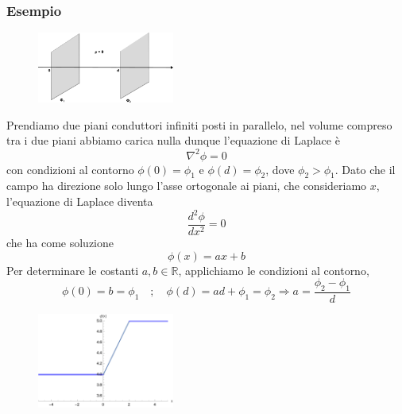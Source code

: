 \subsubsection{Esempio}
\begin{figure} %
    \centering
    \includegraphics[width=0.4\textwidth]{images/laplacezero} %
\end{figure}
Prendiamo due piani conduttori infiniti posti in parallelo, nel volume compreso tra i due piani abbiamo carica nulla dunque l'equazione di Laplace \`e 
\begin{equation*}
	\nabla^2 \phi = 0
\end{equation*}
con condizioni al contorno $\phi(0) = \phi_1$ e $\phi(d) = \phi_2$, dove $\phi_2 > \phi_1$. Dato che il campo ha direzione solo lungo l'asse ortogonale ai piani, che consideriamo $x$, l'equazione di Laplace diventa
\begin{equation*}
	\frac{d^2\phi}{dx^2} = 0
\end{equation*}
che ha come soluzione 
\begin{equation*}
	\phi(x) = ax + b
\end{equation*}
Per determinare le costanti $a,b \in \mathbb{R}$, applichiamo le condizioni al contorno, 
\begin{equation*}
	\phi(0) = b = \phi_1 \quad ; \quad \phi(d) = ad+\phi_1 = \phi_2 \Rightarrow a = \frac{\phi_2 - \phi_1}{d}
\end{equation*}

\begin{figure} %
    \centering
    \includegraphics[width=0.4\textwidth]{images/planefield} %
\end{figure}

